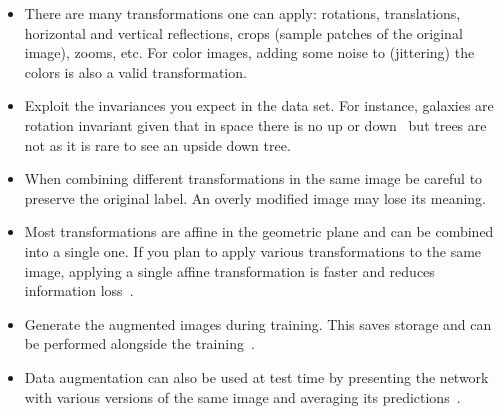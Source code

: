 \begin{itemize}
	\item There are many transformations one can apply: rotations, translations, horizontal and vertical reflections, crops (sample patches of the original image), zooms, etc. For color images, adding some noise to (jittering) the colors is also a valid transformation.

	\item Exploit the invariances you expect in the data set. For instance, galaxies are rotation invariant given that in space there is no up or down~\cite{Dieleman2015} but trees are not as it is rare to see an upside down tree.

	\item When combining different transformations in the same image be careful to preserve the original label. An overly modified image may lose its meaning. 

	\item Most transformations are affine in the geometric plane and can be combined into a single one. If you plan to apply various transformations to the same image, applying a single affine transformation is faster and reduces information loss~\cite{Dieleman2015}.

	\item Generate the augmented images during training. This saves storage and can be performed alongside the training~\cite{Krizhevsky2012}.

	\item Data augmentation can also be used at test time by presenting the network with various versions of the same image and averaging its predictions~\cite{Krizhevsky2012}. 
	
\end{itemize}

